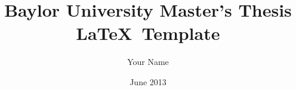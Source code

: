 \documentclass
[
]
{thesis}
\title{Baylor University Master's Thesis \LaTeX\ Template}
\author{Your Name}
\date{June 2013}
\begin{document}
	
	 
	
	
	
	
	\thesisAppendixPage 
	\begin{appendices}
		\appendix %
		
		
	\end{appendices}
	
	
	
\end{document}
